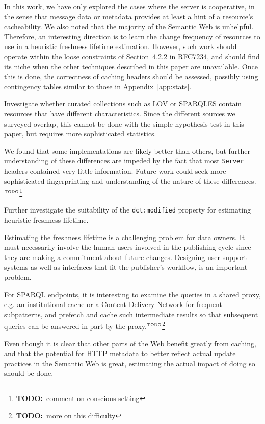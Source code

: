 \documentclass{llncs}
\newcommand{\rdfterm}[1]{\texttt{#1}}
\newcommand{\httph}[1]{\texttt{#1}}
\newcommand{\todo}[1]{\ensuremath{^{\textrm{\tiny{TODO}\normalsize}}}\footnote{\textbf{TODO:}~#1}}
\begin{document}
In this work, we have only explored the cases where the server is
cooperative, in the sense that message data or metadata provides at
least a hint of a resource's cacheability. We also noted that the
majority of the Semantic Web is unhelpful. Therefore, an interesting
direction is to learn the change frequency of resources to use in a
heuristic freshness lifetime estimation. However, such work should
operate within the loose constraints of Section~4.2.2 in RFC7234, and
should find its niche when the other techniques described in this paper
are unavailable. Once this is done, the correctness of caching headers
should be assessed, possibly using contingency tables similar to those
in Appendix~\ref{app:stats}.

Investigate whether curated collections such as LOV or SPARQLES
contain resources that have different characteristics. Since the
different sources we surveyed overlap, this cannot be done with the
simple hypothesis test in this paper, but requires more sophisticated
statistics.

We found that some implementations are likely better than others, but
further understanding of these differences are impeded by the fact
that most \httph{Server} headers contained very little
information. Future work could seek more sophisticated fingerprinting
and understanding of the nature of these differences.\todo{comment on
  conscious setting}

Further investigate the suitability of the \rdfterm{dct:modified}
property for estimating heuristic freshness lifetime.

Estimating the freshness lifetime is a challenging problem for data
owners. It must necessarily involve the human users involved in the
publishing cycle since they are making a commitment about future
changes. Designing user support systems as well as interfaces that fit
the publisher's workflow, is an important problem.

For SPARQL endpoints, it is interesting to examine the queries in a
shared proxy, e.g. an institutional cache or a Content
Delivery Network for frequent subpatterns, and prefetch and cache such
intermediate results so that subsequent queries can be answered in
part by the proxy.\todo{more on this difficulty}

Even though it is clear that other parts of the Web benefit greatly
from caching, and that the potential for HTTP metadata to better
reflect actual update practices in the Semantic Web is great,
estimating the actual impact of doing so should be done.
\end{document}
